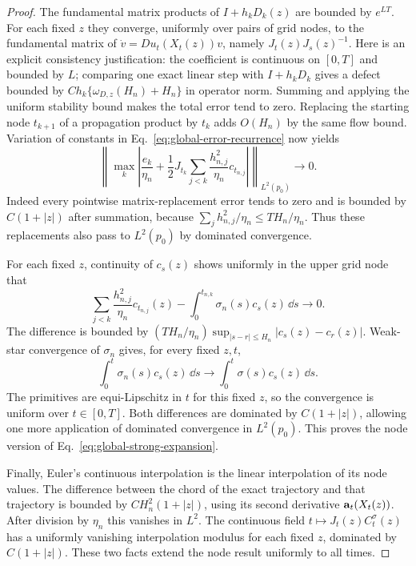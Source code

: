 \begin{proof}
The fundamental matrix products of $I+h_kD_k(z)$ are bounded by
$e^{LT}$.  For each fixed $z$ they converge, uniformly over pairs of
grid nodes, to the fundamental matrix of
$\dot v=Du_t(X_t(z))v$, namely $J_t(z)J_s(z)^{-1}$.
Here is an explicit consistency justification: the coefficient is
continuous on $[0,T]$ and bounded by $L$; comparing one exact linear
step with $I+h_kD_k$ gives a defect bounded by
$C h_k\{\omega_{D,z}(H_n)+H_n\}$ in operator norm.
Summing and applying the uniform stability bound makes the total
error tend to zero.  Replacing the starting node $t_{k+1}$ of a
propagation product by $t_k$ adds $O(H_n)$ by the same flow bound.
Variation of constants in Eq.~\eqref{eq:global-error-recurrence}
now yields
\begin{equation}
 \left\|\max_k\left|
 \frac{e_k}{\eta_n}+\frac12J_{t_k}
       \sum_{j<k}\frac{h_{n,j}^2}{\eta_n}c_{t_{n,j}}
                  \right|\right\|_{L^2(p_0)}\longrightarrow0.
 \label{eq:global-discrete-variation}
\end{equation}
Indeed every pointwise matrix-replacement error tends to zero and is
bounded by $C(1+|z|)$ after summation, because
$\sum_j h_{n,j}^2/\eta_n\le TH_n/\eta_n$.  Thus these replacements
also pass to $L^2(p_0)$ by dominated convergence.

For each fixed $z$, continuity of $c_s(z)$ shows uniformly in the
upper grid node that
\[
 \sum_{j<k}\frac{h_{n,j}^2}{\eta_n}c_{t_{n,j}}(z)
 -\int_0^{t_{n,k}}\sigma_n(s)c_s(z)\,\dd s\longrightarrow0.
\]
The difference is bounded by
$(TH_n/\eta_n)\sup_{|s-r|\le H_n}|c_s(z)-c_r(z)|$.
Weak-star convergence of $\sigma_n$ gives, for every fixed $z,t$,
\[
 \int_0^t\sigma_n(s)c_s(z)\,\dd s
 \longrightarrow\int_0^t\sigma(s)c_s(z)\,\dd s.
\]
The primitives are equi-Lipschitz in $t$ for this fixed $z$, so the
convergence is uniform over $t\in[0,T]$.  Both differences are
dominated by $C(1+|z|)$, allowing one more application of dominated
convergence in $L^2(p_0)$.  This proves the node version of
Eq.~\eqref{eq:global-strong-expansion}.

Finally, Euler's continuous interpolation is the linear interpolation
of its node values.  The difference between the chord of the exact
trajectory and that trajectory is bounded by
$CH_n^2(1+|z|)$, using its second derivative $\mathbf a_t(X_t(z))$.
After division by $\eta_n$ this vanishes in $L^2$.  The continuous
field $t\mapsto J_t(z)C_t^\sigma(z)$ has a uniformly vanishing
interpolation modulus for each fixed $z$, dominated by $C(1+|z|)$.
These two facts extend the node result uniformly to all times.
\end{proof}

